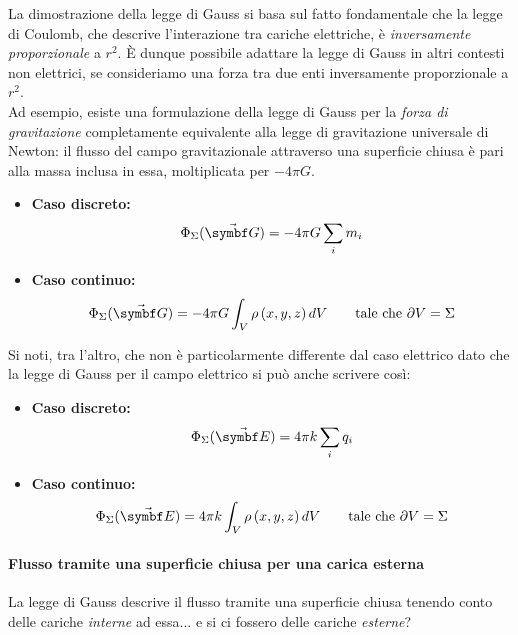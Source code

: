 \begin{digression}\label{LeggeGaussMoltoGeneralizzata}
	La dimostrazione della legge di Gauss si basa sul fatto fondamentale che la legge di Coulomb, che descrive l'interazione tra cariche elettriche, è \textit{inversamente proporzionale} a $r^2$. È dunque possibile adattare la legge di Gauss in altri contesti non elettrici, se consideriamo una forza tra due enti inversamente proporzionale a $r^2$.\\
	Ad esempio, esiste una formulazione della legge di Gauss per la \textit{forza di gravitazione} completamente equivalente alla legge di gravitazione universale di Newton: il flusso del campo gravitazionale attraverso una superficie chiusa è pari alla massa inclusa in essa, moltiplicata per $-4\pi G$.
	\begin{itemize}
		\item \textbf{Caso discreto:}
		\begin{equation}
			\Phi_\Sigma(\vba{G})=-4\pi G\sum_i m_i
		\end{equation}
		\item \textbf{Caso continuo:}
		\begin{equation}
			\Phi_\Sigma(\vba{G})=-4\pi G\int_{V}\rho\left(x,y,z\right)dV\qquad\text{tale che}\ \partial V=\Sigma
		\end{equation}
	\end{itemize}
	Si noti, tra l'altro, che non è particolarmente differente dal caso elettrico dato che la legge di Gauss per il campo elettrico si può anche scrivere così:
	\begin{itemize}
		\item \textbf{Caso discreto:}
		\begin{equation*}
			\Phi_\Sigma(\vba{E})=4\pi k\sum_i q_i
		\end{equation*}
		\item \textbf{Caso continuo:}
		\begin{equation}
			\Phi_\Sigma(\vba{E})=4\pi k\int_{V}\rho\left(x,y,z\right)dV\qquad\text{tale che}\ \partial V=\Sigma
		\end{equation}
	\end{itemize}
\end{digression}
\paragraph{Flusso tramite una superficie chiusa per una carica esterna}
La legge di Gauss descrive il flusso tramite una superficie chiusa tenendo conto delle cariche \textit{interne} ad essa... e si ci fossero delle cariche \textit{esterne}?

